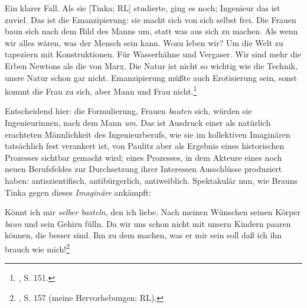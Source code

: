 \documentclass[%
	fontsize=10pt,%
	twoside,%
	headings=optiontoheadandtoc,%
	showtrims]{scrbook}
\renewenvironment{quote}{%
  \addmargin[\genericindent]{0pt}%
  \KOMAoptions{parskip=true}%
  \ifdim\parskip>0pt\else\addvspace{\intextsep}\fi
}{%
  \par
  \endaddmargin\vspace{\intextsep}
}
\begin{document}
\begin{quote}
\par Ein klarer Fall. Als sie {[}Tinka; RL{]} studierte, ging es noch; Ingenieur \textendash{} das ist zuviel. Das ist die Emanzipierung: sie macht sich von sich selbst frei. Die Frauen baun sich nach dem Bild des Manns um, statt was aus sich zu machen. Als wenn wir alles wären, was der Mensch sein kann. Wozu leben wir? Um die Welt zu tapeziern mit Konstruktionen. Für Wasserhähne und Vergaser. Wir sind mehr die Erben Newtons als die von Marx. Die Natur ist nicht so wichtig wie die Technik, unsre Natur schon gar nicht. Emanzipierung \textendash{} müßte auch Erotisierung sein, sonst kommt die Frau zu sich, aber Mann und Frau nicht.\footnote{\cite[][]{braun1990a}, S. 151.} 
\end{quote}
\par Entscheidend hier: die Formulierung, Frauen \emph{bauten} sich, würden sie Ingenieurinnen, nach dem Mann \emph{um}. Das ist Ausdruck einer als natürlich erachteten Männlichkeit des Ingenieurberufs, wie sie im kollektiven Imaginären tatsächlich fest verankert ist, von Paulitz aber als Ergebnis eines historischen Prozesses sichtbar gemacht wird; eines Prozesses, in dem Akteure eines noch neuen Berufsfeldes zur Durchsetzung ihrer Interessen Ausschlüsse produziert haben: antiszientifisch, antibürgerlich, antiweiblich. Spektakulär nun, wie Brauns Tinka gegen dieses \emph{Imaginäre} ankämpft:\begin{quote}
\par Könnt ich mir \emph{selber basteln}, den ich liebe. Nach meinen Wünschen seinen Körper \emph{baun} und sein Gehirn fülln. Da wir uns schon nicht mit unsern Kindern paaren können, die besser sind. Ihn zu dem machen, was er mir sein soll \textendash{} daß ich ihn brauch wie mich!\footnote{\cite[][]{braun1990a}, S. 157 (meine Hervorhebungen; RL).} 
\end{quote}
\end{document}
